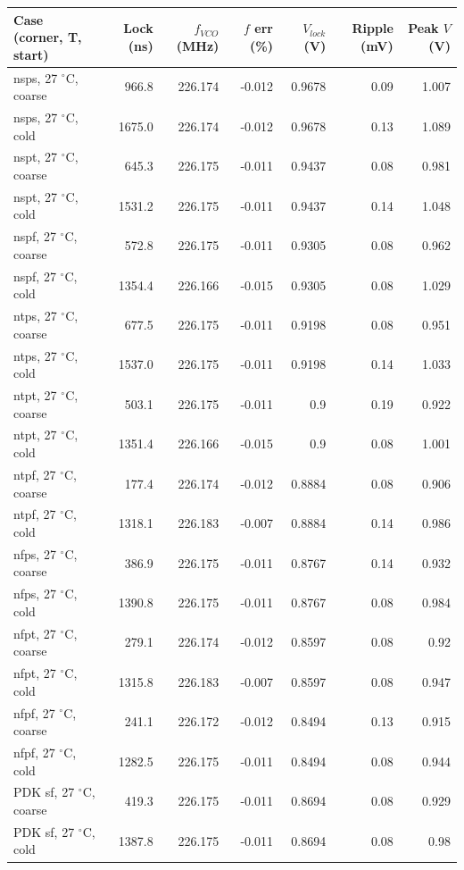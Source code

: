 \begin{tabular}{lrrrrrr}\toprule
Case (corner, T, start) & Lock (ns) & $f_{VCO}$ (MHz) & $f$ err (\%) & $V_{lock}$ (V) & Ripple (mV) & Peak $V$ (V) \\\midrule
nsps, 27 $^\circ$C, coarse & 966.8 & 226.174 & -0.012 & 0.9678 & 0.09 & 1.007 \\
nsps, 27 $^\circ$C, cold & 1675.0 & 226.174 & -0.012 & 0.9678 & 0.13 & 1.089 \\
nspt, 27 $^\circ$C, coarse & 645.3 & 226.175 & -0.011 & 0.9437 & 0.08 & 0.981 \\
nspt, 27 $^\circ$C, cold & 1531.2 & 226.175 & -0.011 & 0.9437 & 0.14 & 1.048 \\
nspf, 27 $^\circ$C, coarse & 572.8 & 226.175 & -0.011 & 0.9305 & 0.08 & 0.962 \\
nspf, 27 $^\circ$C, cold & 1354.4 & 226.166 & -0.015 & 0.9305 & 0.08 & 1.029 \\
ntps, 27 $^\circ$C, coarse & 677.5 & 226.175 & -0.011 & 0.9198 & 0.08 & 0.951 \\
ntps, 27 $^\circ$C, cold & 1537.0 & 226.175 & -0.011 & 0.9198 & 0.14 & 1.033 \\
ntpt, 27 $^\circ$C, coarse & 503.1 & 226.175 & -0.011 & 0.9 & 0.19 & 0.922 \\
ntpt, 27 $^\circ$C, cold & 1351.4 & 226.166 & -0.015 & 0.9 & 0.08 & 1.001 \\
ntpf, 27 $^\circ$C, coarse & 177.4 & 226.174 & -0.012 & 0.8884 & 0.08 & 0.906 \\
ntpf, 27 $^\circ$C, cold & 1318.1 & 226.183 & -0.007 & 0.8884 & 0.14 & 0.986 \\
nfps, 27 $^\circ$C, coarse & 386.9 & 226.175 & -0.011 & 0.8767 & 0.14 & 0.932 \\
nfps, 27 $^\circ$C, cold & 1390.8 & 226.175 & -0.011 & 0.8767 & 0.08 & 0.984 \\
nfpt, 27 $^\circ$C, coarse & 279.1 & 226.174 & -0.012 & 0.8597 & 0.08 & 0.92 \\
nfpt, 27 $^\circ$C, cold & 1315.8 & 226.183 & -0.007 & 0.8597 & 0.08 & 0.947 \\
nfpf, 27 $^\circ$C, coarse & 241.1 & 226.172 & -0.012 & 0.8494 & 0.13 & 0.915 \\
nfpf, 27 $^\circ$C, cold & 1282.5 & 226.175 & -0.011 & 0.8494 & 0.08 & 0.944 \\
PDK sf, 27 $^\circ$C, coarse & 419.3 & 226.175 & -0.011 & 0.8694 & 0.08 & 0.929 \\
PDK sf, 27 $^\circ$C, cold & 1387.8 & 226.175 & -0.011 & 0.8694 & 0.08 & 0.98 \\

\end{tabular}

